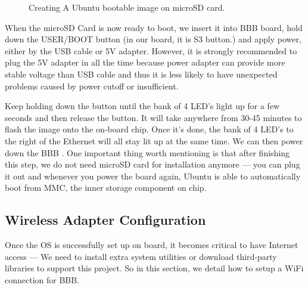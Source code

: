 \documentclass[12pt,journal,draftclsnofoot,onecolumn]{IEEEtran}
\begin{document}
\begin{figure}[htb]
	\centering
     \caption{Creating A Ubuntu bootable image on microSD card.}
     \end{figure}

When the microSD Card is now ready to boot, we insert it into BBB board, hold down the USER/BOOT button (in our board, it is S3 button.) and apply power, either by the USB cable or 5V adapter. However, it is strongly recommended to plug the 5V adapter in all the time because power adapter can provide more stable voltage than USB cable and thus it is less likely to have unexpected problems caused by power cutoff or insufficient.

Keep holding down the button until  the bank of 4 LED's light up for a few seconds and then release the button.
It will take anywhere from 30-45 minutes to flash the image onto the on-board chip. Once it's done, the bank of 4 LED's to the right of the Ethernet will all stay lit up at the same time. We can then power down the BBB \cite{flashBB}. One important thing worth mentioning is that after finishing this step, we do not need microSD card for installation anymore --- you can plug it out and whenever you power the board again, Ubuntu is able to automatically boot from MMC, the inner storage component on chip.
	
\subsection{Wireless Adapter Configuration}\label{Wireless}
Once the OS is successfully set up on board, it becomes critical to have Internet access --- We need to install extra system utilities or download third-party libraries to support this project. So in this section, we detail how to setup a WiFi connection for BBB.
\end{document}
